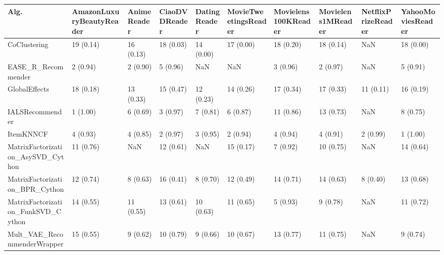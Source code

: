 \begin{tabular}{llllllllll}
\toprule
                               Alg. & AmazonLuxuryBeautyReader & AnimeReader & CiaoDVDReader & DatingReader & MovieTweetingsReader & Movielens100KReader & Movielens1MReader & NetflixPrizeReader & YahooMoviesReader \\
\midrule
                       CoClustering &                19 (0.14) &   16 (0.13) &     18 (0.03) &    14 (0.00) &            17 (0.00) &           18 (0.20) &         18 (0.14) &                NaN &         18 (0.00) \\
                 EASE\_R\_Recommender &                 2 (0.94) &    2 (0.90) &      5 (0.96) &          NaN &                  NaN &            3 (0.96) &          2 (0.97) &                NaN &          5 (0.91) \\
                      GlobalEffects &                18 (0.18) &   13 (0.33) &     15 (0.47) &    12 (0.23) &            14 (0.26) &           17 (0.34) &         17 (0.33) &          11 (0.11) &         16 (0.19) \\
                    IALSRecommender &                 1 (1.00) &    6 (0.69) &      3 (0.97) &     7 (0.81) &             6 (0.87) &           11 (0.86) &         13 (0.73) &                NaN &          8 (0.75) \\
                          ItemKNNCF &                 4 (0.93) &    4 (0.85) &      2 (0.97) &     3 (0.95) &             2 (0.94) &            4 (0.94) &          4 (0.91) &           2 (0.99) &          1 (1.00) \\
  MatrixFactorization\_AsySVD\_Cython &                11 (0.76) &         NaN &     12 (0.61) &          NaN &            15 (0.17) &            7 (0.92) &         10 (0.75) &                NaN &         14 (0.64) \\
     MatrixFactorization\_BPR\_Cython &                12 (0.74) &    8 (0.63) &     16 (0.41) &     8 (0.70) &            12 (0.49) &           14 (0.71) &         14 (0.63) &           8 (0.40) &         13 (0.68) \\
 MatrixFactorization\_FunkSVD\_Cython &                14 (0.55) &   11 (0.55) &     13 (0.61) &    10 (0.63) &            11 (0.65) &            5 (0.93) &          9 (0.78) &                NaN &         11 (0.72) \\
        Mult\_VAE\_RecommenderWrapper &                15 (0.55) &    9 (0.62) &     10 (0.79) &     9 (0.66) &            10 (0.67) &           13 (0.77) &         11 (0.75) &                NaN &          9 (0.74) \\

\end{tabular}
